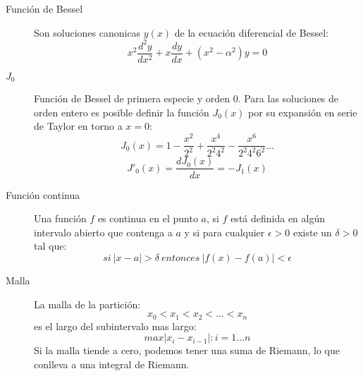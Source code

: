 \begin{description}
	\item[Función de Bessel]
	Son soluciones canonicas $y(x)$ de la ecuación diferencial de
Bessel:
$$
x^2 \frac{d^2 y}{dx^2} + x \frac{dy}{dx} + (x^2 - \alpha^2)y = 0
$$
	\item[$J_0$]
	Función de Bessel de primera especie y orden 0. Para las soluciones de orden entero es
posible definir la función $J_0(x)$ por su expansión en serie de Taylor en
torno a $x = 0$:
$$
J_0(x)= 1-\frac{x^2}{2^2}+\frac{x^4}{2^2 4^2}-\frac{x^6}{2^2 4^2 6^2}\ldots
$$
$$
J'_0(x)= \frac{dJ_0(x)}{dx} = -J_1(x)
$$

	\item[Función continua]
	Una función $f$ es continua en el punto $a$, si $f$ está definida en algún intervalo abierto que contenga
	a $a$ y si para cualquier $\epsilon > 0$ existe un $\delta > 0$ tal que:
	$$si\ |x-a| > \delta\ entonces\ |f(x)-f(a)|< \epsilon$$
	
	\item [Malla]
	La malla de la partición:
	$$x_0 < x_1 < x_2 < \ldots < x_n$$
	es el largo del subintervalo mas largo:
	$$max|x_i - x_{i-1}|: i=1\ldots n$$
	Si la malla tiende a cero, podemos tener una suma de Riemann, lo que conlleva a una integral de Riemann.

\end{description}
